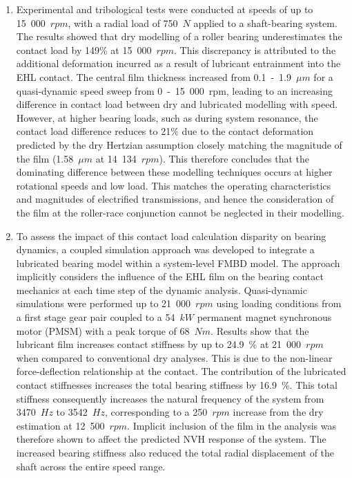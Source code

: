 \begin{enumerate}
	\item Experimental and tribological tests were conducted at speeds of up to 15~000~$rpm$, with a radial load of 750~$N$ applied to a shaft-bearing system. The results showed that dry modelling of a roller bearing underestimates the contact load by 149\% at 15~000~$rpm$. This discrepancy is attributed to the additional deformation incurred as a result of lubricant entrainment into the EHL contact. The central film thickness increased from 0.1~-~1.9~${\mu m}$ for a quasi-dynamic speed sweep from 0~-~15~000~rpm, leading to an increasing difference in contact load between dry and lubricated modelling with speed. However, at higher bearing loads, such as during system resonance, the contact load difference reduces to 21\% due to the contact deformation predicted by the dry Hertzian assumption closely matching the magnitude of the film (1.58~${\mu m}$ at 14~134~$rpm$). This therefore concludes that the dominating difference between these modelling techniques occurs at higher rotational speeds and low load. This matches the operating characteristics and magnitudes of electrified transmissions, and hence the consideration of the film at the roller-race conjunction cannot be neglected in their modelling.
		
	\item To assess the impact of this contact load calculation disparity on bearing dynamics, a coupled simulation approach was developed to integrate a lubricated bearing model within a system-level FMBD model. The approach implicitly considers the influence of the EHL film on the bearing contact mechanics at each time step of the dynamic analysis. Quasi-dynamic simulations were performed up to 21~000~$rpm$ using loading conditions from a first stage gear pair coupled to a 54~$kW$ permanent magnet synchronous motor (PMSM) with a peak torque of 68~$Nm$. Results show that the lubricant film increases contact stiffness by up to 24.9~\% at 21~000~$rpm$ when compared to conventional dry analyses. This is due to the non-linear force-deflection relationship at the contact. 
	The contribution of the lubricated contact stiffnesses increases the total bearing stiffness by 16.9~\%. This total stiffness consequently increases the natural frequency of the system from 3470~$Hz$ to 3542~$Hz$, corresponding to a 250~$rpm$ increase from the dry estimation at 12~500~$rpm$. Implicit inclusion of the film in the analysis was therefore shown to affect the predicted NVH response of the system. The increased bearing stiffness also reduced the total radial displacement of the shaft across the entire speed range.
	

\end{enumerate}
